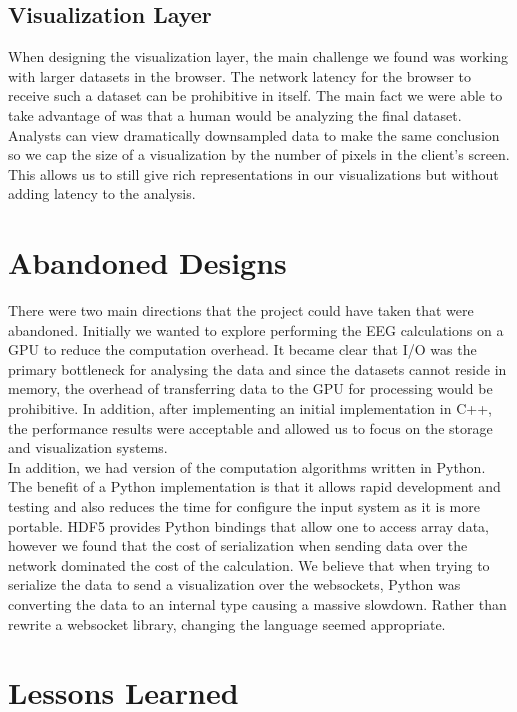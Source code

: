 \subsection{Visualization Layer}

When designing the visualization layer, the main challenge we found was working
with larger datasets in the browser. The network latency for the browser to
receive such a dataset can be prohibitive in itself. The main fact we were able
to take advantage of was that a human would be analyzing the final dataset.
Analysts can view dramatically downsampled data to make the same conclusion so
we cap the size of a visualization by the number of pixels in the client's
screen. This allows us to still give rich representations in our visualizations
but without adding latency to the analysis.

\section{Abandoned Designs}\label{discuss-ch:abandon}

There were two main directions that the project could have taken that were
abandoned. Initially we wanted to explore performing the EEG calculations on a
GPU to reduce the computation overhead. It became clear that I/O was the
primary bottleneck for analysing the data and since the datasets cannot reside
in memory, the overhead of transferring data to the GPU for processing would be
prohibitive. In addition, after implementing an initial implementation in C++,
the performance results were acceptable and allowed us to focus on the storage
and visualization systems. \\

In addition, we had version of the computation algorithms written in Python.
The benefit of a Python implementation is that it allows rapid development and
testing and also reduces the time for configure the input system as it is more
portable. HDF5 provides Python bindings that allow one to access array data,
however we found that the cost of serialization when sending data over the
network dominated the cost of the calculation. We believe that when trying to
serialize the data to send a visualization over the websockets, Python was
converting the data to an internal type causing a massive slowdown. Rather than
rewrite a websocket library, changing the language seemed appropriate.

\section{Lessons Learned}

